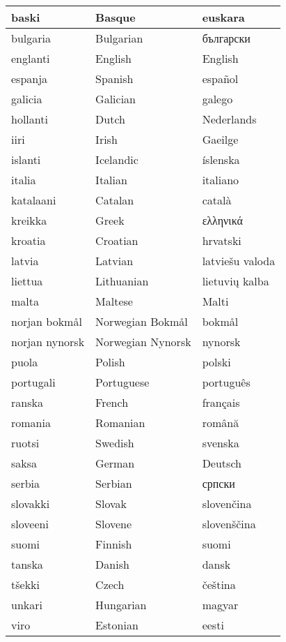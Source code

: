 \documentclass[]{../../metanetpaper}
\begin{document}
 \center
 
 \begin{tabular}{l|l|l}
 \hline baski & Basque & euskara\\
 \hline bulgaria & Bulgarian & български\\
 \hline englanti & English & English\\
 \hline espanja & Spanish & español\\
 \hline galicia & Galician & galego\\
 \hline hollanti & Dutch & Nederlands\\
 \hline iiri & Irish & Gaeilge\\
 \hline islanti & Icelandic & íslenska\\
 \hline italia & Italian & italiano\\
 \hline katalaani & Catalan & català\\
 \hline kreikka & Greek & ελληνικά\\
 \hline kroatia & Croatian & hrvatski\\
 \hline latvia & Latvian & latviešu valoda\\
 \hline liettua & Lithuanian & lietuvių kalba\\
 \hline malta & Maltese & Malti\\
 \hline norjan bokmål & Norwegian Bokmål & bokmål\\
 \hline norjan nynorsk & Norwegian Nynorsk & nynorsk\\
 \hline puola & Polish & polski\\
 \hline portugali & Portuguese & português\\
 \hline ranska & French & français\\
 \hline romania & Romanian & română\\
 \hline ruotsi & Swedish & svenska\\
 \hline saksa & German & Deutsch\\
 \hline serbia & Serbian & српски\\
 \hline slovakki & Slovak & slovenčina\\
 \hline sloveeni & Slovene & slovenščina\\
 \hline suomi & Finnish & suomi\\
 \hline tanska & Danish & dansk\\
 \hline tšekki & Czech & čeština\\
 \hline unkari & Hungarian & magyar\\
 \hline viro & Estonian & eesti\\
 \end{tabular}
\end{document}
